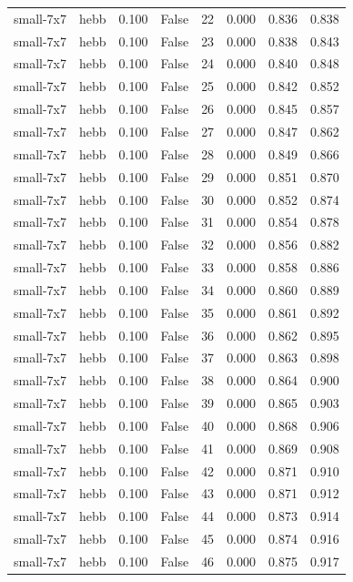 \begin{tabular}{llrrrrrr}
small-7x7 & hebb & 0.100 & False & 22 & 0.000 & 0.836 & 0.838 \\
small-7x7 & hebb & 0.100 & False & 23 & 0.000 & 0.838 & 0.843 \\
small-7x7 & hebb & 0.100 & False & 24 & 0.000 & 0.840 & 0.848 \\
small-7x7 & hebb & 0.100 & False & 25 & 0.000 & 0.842 & 0.852 \\
small-7x7 & hebb & 0.100 & False & 26 & 0.000 & 0.845 & 0.857 \\
small-7x7 & hebb & 0.100 & False & 27 & 0.000 & 0.847 & 0.862 \\
small-7x7 & hebb & 0.100 & False & 28 & 0.000 & 0.849 & 0.866 \\
small-7x7 & hebb & 0.100 & False & 29 & 0.000 & 0.851 & 0.870 \\
small-7x7 & hebb & 0.100 & False & 30 & 0.000 & 0.852 & 0.874 \\
small-7x7 & hebb & 0.100 & False & 31 & 0.000 & 0.854 & 0.878 \\
small-7x7 & hebb & 0.100 & False & 32 & 0.000 & 0.856 & 0.882 \\
small-7x7 & hebb & 0.100 & False & 33 & 0.000 & 0.858 & 0.886 \\
small-7x7 & hebb & 0.100 & False & 34 & 0.000 & 0.860 & 0.889 \\
small-7x7 & hebb & 0.100 & False & 35 & 0.000 & 0.861 & 0.892 \\
small-7x7 & hebb & 0.100 & False & 36 & 0.000 & 0.862 & 0.895 \\
small-7x7 & hebb & 0.100 & False & 37 & 0.000 & 0.863 & 0.898 \\
small-7x7 & hebb & 0.100 & False & 38 & 0.000 & 0.864 & 0.900 \\
small-7x7 & hebb & 0.100 & False & 39 & 0.000 & 0.865 & 0.903 \\
small-7x7 & hebb & 0.100 & False & 40 & 0.000 & 0.868 & 0.906 \\
small-7x7 & hebb & 0.100 & False & 41 & 0.000 & 0.869 & 0.908 \\
small-7x7 & hebb & 0.100 & False & 42 & 0.000 & 0.871 & 0.910 \\
small-7x7 & hebb & 0.100 & False & 43 & 0.000 & 0.871 & 0.912 \\
small-7x7 & hebb & 0.100 & False & 44 & 0.000 & 0.873 & 0.914 \\
small-7x7 & hebb & 0.100 & False & 45 & 0.000 & 0.874 & 0.916 \\
small-7x7 & hebb & 0.100 & False & 46 & 0.000 & 0.875 & 0.917 \\

\end{tabular}
